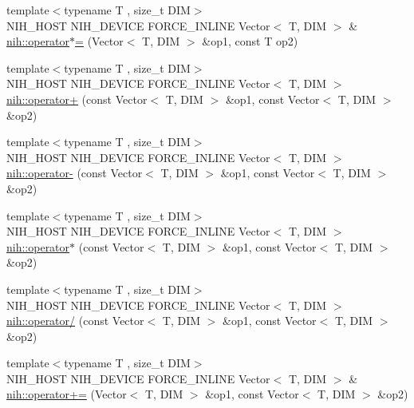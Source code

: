 \begin{DoxyCompactItemize}
\item 
{\footnotesize template$<$typename T , size\-\_\-t \-D\-I\-M$>$ }\\\-N\-I\-H\-\_\-\-H\-O\-S\-T \-N\-I\-H\-\_\-\-D\-E\-V\-I\-C\-E \*
\-F\-O\-R\-C\-E\-\_\-\-I\-N\-L\-I\-N\-E \-Vector$<$ \-T, \-D\-I\-M $>$ \& \hyperlink{group__linalg_gabaaa34dafadbdbaaff130b02d28b3ad1}{nih\-::operator$\ast$=} (\-Vector$<$ \-T, \-D\-I\-M $>$ \&op1, const \-T op2)
\item 
{\footnotesize template$<$typename T , size\-\_\-t \-D\-I\-M$>$ }\\\-N\-I\-H\-\_\-\-H\-O\-S\-T \-N\-I\-H\-\_\-\-D\-E\-V\-I\-C\-E \*
\-F\-O\-R\-C\-E\-\_\-\-I\-N\-L\-I\-N\-E \-Vector$<$ \-T, \-D\-I\-M $>$ \hyperlink{group__linalg_ga9235b9ea803b8d0ef379565a3ff7dd76}{nih\-::operator+} (const \-Vector$<$ \-T, \-D\-I\-M $>$ \&op1, const \-Vector$<$ \-T, \-D\-I\-M $>$ \&op2)
\item 
{\footnotesize template$<$typename T , size\-\_\-t \-D\-I\-M$>$ }\\\-N\-I\-H\-\_\-\-H\-O\-S\-T \-N\-I\-H\-\_\-\-D\-E\-V\-I\-C\-E \*
\-F\-O\-R\-C\-E\-\_\-\-I\-N\-L\-I\-N\-E \-Vector$<$ \-T, \-D\-I\-M $>$ \hyperlink{group__linalg_ga8782aba246b1da852d9f4390d22336f8}{nih\-::operator-\/} (const \-Vector$<$ \-T, \-D\-I\-M $>$ \&op1, const \-Vector$<$ \-T, \-D\-I\-M $>$ \&op2)
\item 
{\footnotesize template$<$typename T , size\-\_\-t \-D\-I\-M$>$ }\\\-N\-I\-H\-\_\-\-H\-O\-S\-T \-N\-I\-H\-\_\-\-D\-E\-V\-I\-C\-E \*
\-F\-O\-R\-C\-E\-\_\-\-I\-N\-L\-I\-N\-E \-Vector$<$ \-T, \-D\-I\-M $>$ \hyperlink{group__linalg_gafd7b9505e791364aa7e9b2d4598d00a6}{nih\-::operator$\ast$} (const \-Vector$<$ \-T, \-D\-I\-M $>$ \&op1, const \-Vector$<$ \-T, \-D\-I\-M $>$ \&op2)
\item 
{\footnotesize template$<$typename T , size\-\_\-t \-D\-I\-M$>$ }\\\-N\-I\-H\-\_\-\-H\-O\-S\-T \-N\-I\-H\-\_\-\-D\-E\-V\-I\-C\-E \*
\-F\-O\-R\-C\-E\-\_\-\-I\-N\-L\-I\-N\-E \-Vector$<$ \-T, \-D\-I\-M $>$ \hyperlink{group__linalg_ga7989586a3f3db4aa98a7866a4cdf080b}{nih\-::operator/} (const \-Vector$<$ \-T, \-D\-I\-M $>$ \&op1, const \-Vector$<$ \-T, \-D\-I\-M $>$ \&op2)
\item 
{\footnotesize template$<$typename T , size\-\_\-t \-D\-I\-M$>$ }\\\-N\-I\-H\-\_\-\-H\-O\-S\-T \-N\-I\-H\-\_\-\-D\-E\-V\-I\-C\-E \*
\-F\-O\-R\-C\-E\-\_\-\-I\-N\-L\-I\-N\-E \-Vector$<$ \-T, \-D\-I\-M $>$ \& \hyperlink{group__linalg_ga4226e5c3bf0305cf0a0459bf43564223}{nih\-::operator+=} (\-Vector$<$ \-T, \-D\-I\-M $>$ \&op1, const \-Vector$<$ \-T, \-D\-I\-M $>$ \&op2)

\end{DoxyCompactItemize}
